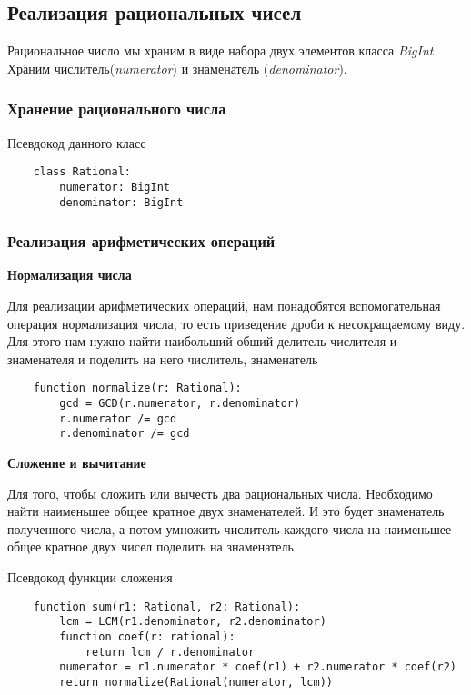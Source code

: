 \documentclass[a4paper,article,14pt]{extarticle}
\begin{document}
\subsection{Реализация рациональных чисел}

Рациональное число мы храним в виде набора двух элементов класса \emph{BigInt}
Храним числитель(\emph{numerator}) и знаменатель (\emph{denominator}).

\subsubsection{Хранение рационального числа}

Псевдокод данного класс
\begin{lstlisting}
    class Rational:
        numerator: BigInt
        denominator: BigInt    
\end{lstlisting}

\subsubsection{Реализация арифметических операций}

\textbf{Нормализация числа}

Для реализации арифметических операций, нам понадобятся 
вспомогательная операция нормализация числа, то есть приведение дроби
к несокращаемому виду. Для этого нам нужно найти наибольший обший делитель числителя и 
знаменателя и поделить на него числитель, знаменатель

\begin{lstlisting}
    function normalize(r: Rational):
        gcd = GCD(r.numerator, r.denominator)
        r.numerator /= gcd
        r.denominator /= gcd
\end{lstlisting}

\textbf{Сложение и вычитание}

Для того, чтобы сложить или вычесть два рациональных числа. Необходимо найти
наименьшее общее кратное двух знаменателей. И это будет знаменатель полученного
числа, а потом умножить числитель каждого числа на наименьшее общее кратное двух чисел поделить на знаменатель

Псевдокод функции сложения

\begin{lstlisting}
    function sum(r1: Rational, r2: Rational):
        lcm = LCM(r1.denominator, r2.denominator)
        function coef(r: rational):
            return lcm / r.denominator
        numerator = r1.numerator * coef(r1) + r2.numerator * coef(r2)
        return normalize(Rational(numerator, lcm))
\end{lstlisting}
\end{document}

